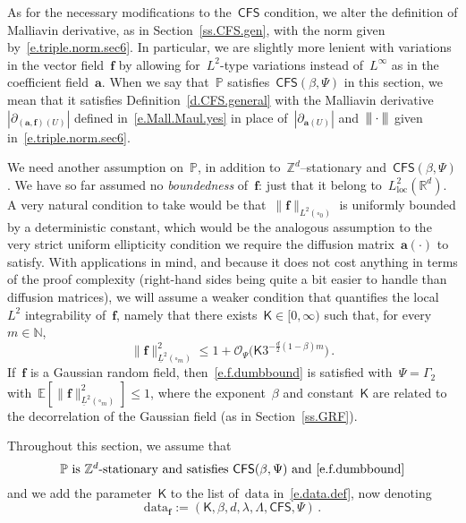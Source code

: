 \documentclass[11pt,twoside]{article} %
\let\oldsquare\square %
\renewcommand{\square}{\oldsquare}
\numberwithin{equation}{section}
\theoremstyle{definition}
\newcommand{\vertiii}{\vert\kern-0.3ex\vert\kern-0.25ex\vert}
\newcommand*{\N}{\ensuremath{\mathbb{N}}}
\newcommand*{\Zd}{\ensuremath{\mathbb{Z}^d}}
\newcommand*{\Rd}{\ensuremath{\mathbb{R}^d}}
\newcommand{\f}{\mathbf{f}}
\renewcommand{\a}{\mathbf{a}}
\newcommand{\cu}{\square}
\renewcommand{\P}{\mathbb{P}}
\newcommand{\E}{\mathbb{E}}
\renewcommand{\O}{\mathcal{O}}
\newcommand{\data}{\mathrm{data}}
\newcommand{\CFS}{\mathsf{CFS}}
\begin{document}
\smallskip

As for the necessary modifications to the~$\CFS$ condition, we alter the definition of Malliavin derivative, as in Section~\ref{ss.CFS.gen}, with the norm given by~\eqref{e.triple.norm.sec6}. 
In particular, we are slightly more lenient with variations in the vector field~$\f$ by allowing for~$L^2$-type variations instead of~$L^\infty$ as in the coefficient field~$\a$. When we say that~$\P$ satisfies~$\CFS(\beta,\Psi)$ in this section, we mean that it satisfies Definition~\ref{d.CFS.general} with the Malliavin derivative~$|\partial_{(\a,\f)(U)}|$ defined in~\eqref{e.Mall.Maul.yes} in place of~$|\partial_{\a(U)}|$ and~$\vertiii\cdot\vertiii$ given in~\eqref{e.triple.norm.sec6}.

\smallskip

We need another assumption on~$\P$, in addition to~$\Zd$--stationary and~$\CFS(\beta,\Psi)$. We have so far assumed no \emph{boundedness} of~$\f$: just that it belong to~$L^2_{\mathrm{loc}}(\Rd)$. 
A very natural condition to take would be that~$\| \f \|_{L^2(\cu_0)}$ is uniformly bounded by a deterministic constant, which would be the analogous assumption to the very strict uniform ellipticity condition we require the diffusion matrix~$\a(\cdot)$ to satisfy. 
With applications in mind, and because it does not cost anything in terms of the proof complexity (right-hand sides being quite a bit easier to handle than diffusion matrices), 
we will assume a weaker condition that quantifies the local~$L^2$ integrability of~$\f$, namely that there exists~$\mathsf{K}\in [0,\infty)$ such that, for every~$m\in\N$, 
\begin{equation}
\label{e.f.dumbbound}
\| \f \|_{\underline{L}^2(\cu_m)}^2 
\leq 
1 +  \O_\Psi\bigl(\mathsf{K}  3^{-\frac d2 (1-\beta) m} \bigr)
\,.
\end{equation}
If~$\f$ is a Gaussian random field, then~\eqref{e.f.dumbbound} is satisfied with~$\Psi=\Gamma_2$ with~$\E [ \| \f \|_{\underline{L}^2(\cu_m)}^2 ] \leq 1$, where the exponent~$\beta$ and constant~$\mathsf{K}$ are related to the decorrelation of the Gaussian field (as in Section~\ref{ss.GRF}).

\smallskip

Throughout this section, we assume that
\begin{equation} 
\label{e.f.sec.ass}
\P \mbox{ is~$\Zd$-stationary and satisfies~$\CFS(\beta,\Psi)$ and~\eqref{e.f.dumbbound}}
\end{equation}
and we add the parameter~$\mathsf{K}$ to the list of~$\data$ in~\eqref{e.data.def}, now denoting
\begin{equation} 
\label{e.data.def.f}
\data_{\f} := (\mathsf{K},\beta,d,\lambda,\Lambda,\CFS,\Psi)
\,.
\end{equation}
\end{document}
